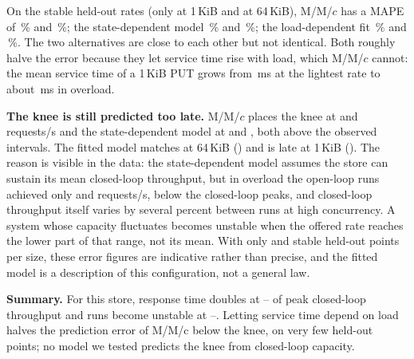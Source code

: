 \documentclass[conference]{IEEEtran}
\begin{document}
On the stable held-out rates (only \RevQSmallHeldOut{} at 1\,KiB and \RevQMidHeldOut{} at
64\,KiB), M/M/$c$ has a MAPE of \RevQSmallMapeMmc\,\% and \RevQMidMapeMmc\,\%; the
state-dependent model \RevQSmallMapeState\,\% and \RevQMidMapeState\,\%; the load-dependent fit
\RevQSmallMapeLoad\,\% and \RevQMidMapeLoad\,\%. The two alternatives are close to each other
but not identical. Both roughly halve the error because they let service time
rise with load, which M/M/$c$ cannot: the mean service time of a 1\,KiB PUT grows from
\RevQSmallServiceLight\,ms at the lightest rate to about \RevQSmallServiceOverload\,ms in
overload.

\textbf{The knee is still predicted too late.} M/M/$c$ places the knee at \RevQSmallKneeMmc{} and
\RevQMidKneeMmc{} requests/s and the state-dependent model at \RevQSmallKneeState{} and
\RevQMidKneeState, both above the observed intervals. The fitted model matches at 64\,KiB
(\RevQMidKneeLoad) and is late at 1\,KiB (\RevQSmallKneeLoad). The reason is visible in the data:
the state-dependent model assumes the store can sustain its mean closed-loop throughput, but in
overload the open-loop runs achieved only \RevQSmallOverload{} and \RevQMidOverload{} requests/s,
below the closed-loop peaks, and closed-loop throughput itself varies by several percent between
runs at high concurrency. A system whose capacity fluctuates becomes unstable when the offered
rate reaches the lower part of that range, not its mean. With only \RevQSmallHeldOut{} and
\RevQMidHeldOut{} stable held-out points per size, these error figures are indicative rather than
precise, and the fitted model is a description of this configuration, not a general law.

\textbf{Summary.} For this store, response time doubles at
\RevQMidRhoKneeLo--\RevQSmallRhoKneeHi{} of peak closed-loop throughput and runs become unstable
at \RevQSmallRhoLastStable--\RevQMidRhoFirstUnstable. Letting service time depend on load halves
the prediction error of M/M/c below the knee, on very few held-out points; no model we tested
predicts the knee from closed-loop capacity.





\end{document}
